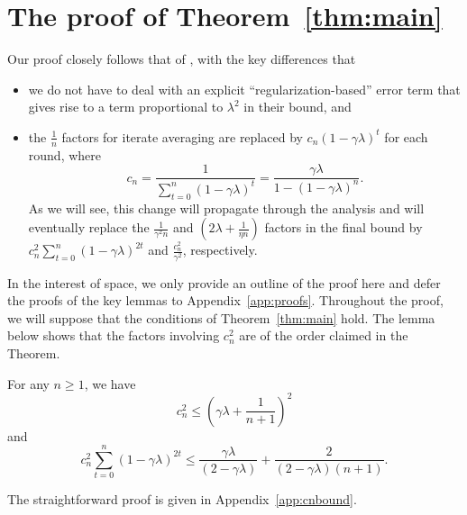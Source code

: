 \documentclass[final,12pt]{colt2018} %
\newcommand{\pa}[1]{\left(#1\right)}
\begin{document}
\section{The proof of Theorem~\ref{thm:main}}\label{sec:analysis}
Our proof closely follows that of \citet[Theorem~1]{DFB16}, with the key differences that 
\begin{itemize}
 \item we do not have to deal with an explicit ``regularization-based'' error term that gives rise to a term proportional to $\lambda^2$ 
in their bound, and
 \item the $\frac{1}{n}$ factors for iterate averaging are replaced by $c_n (1-\gamma\lambda)^t$ for each round, where 
 \[
c_n = \frac{1}{\sum_{t=0}^n (1-\gamma\lambda)^t} = \frac{\gamma\lambda}{1 - \pa{1-\gamma\lambda}^n}.
 \]
 As we will see, this change will propagate through the analysis and will eventually replace the $\frac {1}{\gamma^2 n}$
 and $\pa{2\lambda + \frac{1}{\eta n}}$ factors in the final bound by $c_n^2 \sum_{t=0}^n \pa{1-\gamma\lambda}^{2t}$ and 
$\frac{c_n^2}{\gamma^2}$, respectively.
\end{itemize}
In the interest of space, we only provide an outline of the proof here and defer the proofs of the key lemmas to Appendix~\ref{app:proofs}. 
Throughout the proof, we will suppose that the conditions of Theorem~\ref{thm:main} hold.
The lemma below shows that the factors involving $c_n^2$ are of the order claimed in the Theorem.
\begin{lemma}\label{lem:cnbound}
 For any $n\ge 1$, we have
 \[
  c_n^2 \le \pa{\gamma\lambda + \frac{1}{n+1}}^2
 \]
 and 
 \[
  c_n^2 \sum_{t=0}^n \pa{1-\gamma\lambda}^{2t} \le \frac{\gamma\lambda}{\pa{2-\gamma\lambda}} +
\frac{2}{\pa{2-\gamma\lambda}\pa{n+1}}.
 \]
\end{lemma}
The straightforward proof is given in Appendix~\ref{app:cnbound}.
\end{document}
